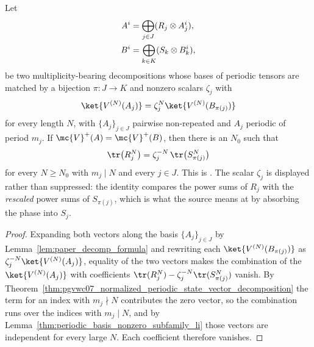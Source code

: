 \begin{lemma}%
    \label{thm:periodic_equalcase_coefficient_extraction}
    \leanok
    Let
    \begin{align}
        A^i & =\bigoplus_{j\in J}(R_j\otimes A_j^i),
        \notag                                       \\
        B^i & =\bigoplus_{k\in K}(S_k\otimes B_k^i),
        \notag
    \end{align}
    be two multiplicity-bearing decompositions whose bases of periodic
    tensors are matched by a bijection $\pi\colon J\to K$ and nonzero scalars
    $\zeta_j$ with
    \begin{align}
        \ket{V^{(N)}(A_j)}=\zeta_j^{N}\ket{V^{(N)}(B_{\pi(j)})}
        \notag
    \end{align}
    for every length $N$, with $\{A_j\}_{j\in J}$ pairwise non-repeated and
    $A_j$ periodic of period $m_j$. If $\mc{V}^+(A)=\mc{V}^+(B)$, then there is
    an $N_0$ such that
    \begin{align}
        \tr\bigl(R_j^{N}\bigr)
        =\zeta_j^{-N}\,\tr\bigl(S_{\pi(j)}^{N}\bigr)
        \notag
    \end{align}
    for every $N\ge N_0$ with $m_j\mid N$ and every $j\in J$.
    This is \cite[lines~672--680]{DeLasCuevas2017Irreducible}. The scalar
    $\zeta_j$ is displayed rather than suppressed: the identity compares the
    power sums of $R_j$ with the \emph{rescaled} power sums of $S_{\pi(j)}$,
    which is what the source means at
    \cite[lines~667--671]{DeLasCuevas2017Irreducible} by absorbing the phase
    into $S_j$.
\end{lemma}

\begin{proof}\leanok
    Expanding both vectors along the basis $\{A_j\}_{j\in J}$ by
    Lemma~\ref{lem:paper_decomp_formula} and rewriting each
    $\ket{V^{(N)}(B_{\pi(j)})}$ as $\zeta_j^{-N}\ket{V^{(N)}(A_j)}$, equality
    of the two vectors makes the combination of the $\ket{V^{(N)}(A_j)}$ with
    coefficients $\tr(R_j^N)-\zeta_j^{-N}\tr(S_{\pi(j)}^N)$ vanish. By
    Theorem~\ref{thm:pgvwc07_normalized_periodic_state_vector_decomposition} the term
    for an index with $m_j\nmid N$ contributes the zero vector, so the
    combination runs over the indices with $m_j\mid N$, and by
    Lemma~\ref{thm:periodic_basis_nonzero_subfamily_li} those vectors are
    independent for every large $N$. Each coefficient therefore vanishes.
\end{proof}

